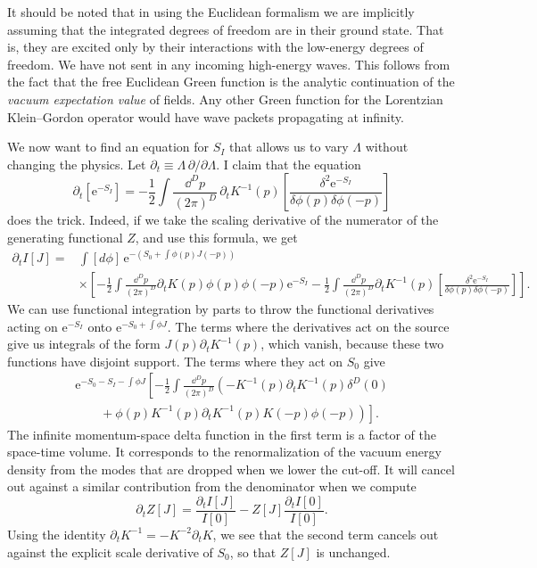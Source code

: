It should be noted that in using the Euclidean formalism we are implicitly
assuming that the integrated degrees of freedom are in their ground state. That
is, they are excited only by their interactions with the low-energy degrees of
freedom. We have not sent in any incoming high-energy waves. This follows from
the fact that the free Euclidean Green function is the analytic continuation
of the \emph{vacuum expectation value} of fields. Any other Green function for
the Lorentzian Klein--Gordon operator would have wave packets propagating at
infinity.

We now want to find an equation for $S_I$ that allows us to vary $\Lambda$
without changing the physics. Let $\partial_t\equiv\Lambda\,\partial/\partial
\Lambda$. I claim that the equation
\[
  \partial_t[\mathrm{e}^{-S_I}]
  =-\frac12\int\frac{\dd^D p}{(2\pi)^D}\,
  \partial_tK^{-1}(p)
  \left[\frac{\delta^2\mathrm{e}^{-S_I}}
  {\delta\phi(p)\delta\phi(-p)}\right]
\]
does the trick. Indeed, if we take the scaling derivative of the numerator of
the generating functional $Z$, and use this formula, we get
\[
\begin{aligned}
  \partial_t I[J]={}&\int[d\phi]\,
  \mathrm{e}^{-(S_0+\int\phi(p)J(-p))}\\
  &\times\left[-\frac12\int\frac{\dd^D p}{(2\pi)^D}
  \partial_tK(p)\phi(p)\phi(-p)\mathrm{e}^{-S_I}
  -\frac12\int\frac{\dd^D p}{(2\pi)^D}\partial_tK^{-1}(p)
  \left[\frac{\delta^2\mathrm{e}^{-S_I}}
  {\delta\phi(p)\delta\phi(-p)}\right]\right].
\end{aligned}
\]
We can use functional integration by parts to throw the functional derivatives
acting on $\mathrm{e}^{-S_I}$ onto
$\mathrm{e}^{-S_0+\int\phi J}$. The terms where the derivatives act on the
source give us integrals of the form $J(p)\partial_tK^{-1}(p)$, which vanish,
because these two functions have disjoint support. The terms where they act on
$S_0$ give
\[
\begin{aligned}
  \mathrm{e}^{-S_0-S_I-\int\phi J}
  \left[-\frac12\int\frac{\dd^D p}{(2\pi)^D}\left(
  -K^{-1}(p)\partial_tK^{-1}(p)\delta^D(0)\right.\right.\\[-2pt]
  \left.\left.\qquad
  +\phi(p)K^{-1}(p)\partial_tK^{-1}(p)K(-p)\phi(-p)\right)\right].
\end{aligned}
\]
The infinite momentum-space delta function in the first term is a factor of
the space-time volume. It corresponds to the renormalization of the vacuum
energy density from the modes that are dropped when we lower the cut-off. It
will cancel out against a similar contribution from the denominator when we
compute
\[
  \partial_t Z[J]=\frac{\partial_t I[J]}{I[0]}
  -Z[J]\frac{\partial_t I[0]}{I[0]} .
\]
Using the identity $\partial_tK^{-1}=-K^{-2}\partial_tK$, we see that the
second term cancels out against the explicit scale derivative of $S_0$, so
that $Z[J]$ is unchanged.

